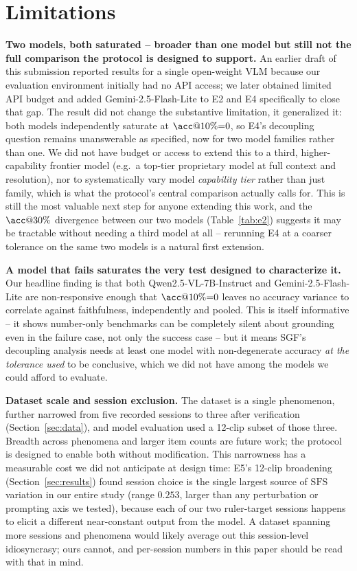 \documentclass[11pt]{article}
\newcommand{\sfs}{\mathrm{SFS}}
\begin{document}
\section{Limitations}
\label{sec:limitations}
\textbf{Two models, both saturated -- broader than one model but still not the
full comparison the protocol is designed to support.} An earlier draft of this
submission reported results for a single open-weight VLM because our
evaluation environment initially had no API access; we later obtained limited
API budget and added Gemini-2.5-Flash-Lite to E2 and E4 specifically to close
that gap. The result did not change the substantive limitation, it generalized
it: both models independently saturate at $\acc@10\%{=}0$, so E4's decoupling
question remains unanswerable as specified, now for two model families rather
than one. We did not have budget or access to extend this to a third,
higher-capability frontier model (e.g.\ a top-tier proprietary model at full
context and resolution), nor to systematically vary model \emph{capability
tier} rather than just family, which is what the protocol's central comparison
actually calls for. This is still the most valuable next step for anyone
extending this work, and the $\acc@30\%$ divergence between our two models
(Table~\ref{tab:e2}) suggests it may be tractable without needing a third model
at all -- rerunning E4 at a coarser tolerance on the same two models is a
natural first extension.

\noindent\textbf{A model that fails saturates the very test designed to
characterize it.} Our headline finding is that both Qwen2.5-VL-7B-Instruct and
Gemini-2.5-Flash-Lite are non-responsive enough that $\acc@10\%{=}0$ leaves no
accuracy variance to correlate against faithfulness, independently and pooled.
This is itself informative -- it shows number-only benchmarks can be completely
silent about grounding even in the failure case, not only the success case --
but it means SGF's decoupling analysis needs at least one model with
non-degenerate accuracy \emph{at the tolerance used} to be conclusive, which we
did not have among the models we could afford to evaluate.

\noindent\textbf{Dataset scale and session exclusion.} The dataset is a single
phenomenon, further narrowed from five recorded sessions to three after
verification (Section~\ref{sec:data}), and model evaluation used a 12-clip
subset of those three. Breadth across phenomena and larger item counts are
future work; the protocol is designed to enable both without modification.
This narrowness has a measurable cost we did not anticipate at design time:
E5's 12-clip broadening (Section~\ref{sec:results}) found session choice is
the single largest source of $\sfs$ variation in our entire study (range
$0.253$, larger than any perturbation or prompting axis we tested), because
each of our two ruler-target sessions happens to elicit a different
near-constant output from the model. A dataset spanning more sessions and
phenomena would likely average out this session-level idiosyncrasy; ours
cannot, and per-session numbers in this paper should be read with that in
mind.
\end{document}
